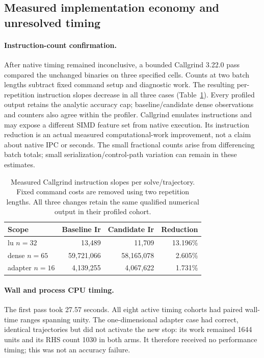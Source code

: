 \subsection{Measured implementation economy and unresolved timing}
\paragraph{Instruction-count confirmation.}
After native timing remained inconclusive, a bounded Callgrind 3.22.0 pass
compared the unchanged binaries on three specified cells. Counts at two batch
lengths subtract fixed command setup and diagnostic work. The resulting
per-repetition instruction slopes decrease in all three cases
(Table~\ref{tab:instructions}). Every profiled output retains the analytic
accuracy cap; baseline/candidate dense observations and counters also agree
within the profiler. Callgrind emulates instructions and may expose a different
SIMD feature set from native execution. Its instruction reduction is an actual
measured computational-work improvement, not a claim about native IPC or seconds.
The small fractional counts arise from differencing batch totals; small
serialization/control-path variation can remain in these estimates.

\begin{table}[t]
\caption{Measured Callgrind instruction slopes per solve/trajectory. Fixed
command costs are removed using two repetition lengths. All three changes
retain the same qualified numerical output in their profiled cohort.}
\label{tab:instructions}
\begin{ruledtabular}
\begin{tabular}{lrrr}
Scope & Baseline Ir & Candidate Ir & Reduction\\
\hline
lu $n=32$ & 13,489 & 11,709 & 13.196\% \\
dense $n=65$ & 59,721,066 & 58,165,078 & 2.605\% \\
adapter $n=16$ & 4,139,255 & 4,067,622 & 1.731\% \\
\end{tabular}
\end{ruledtabular}
\end{table}

\paragraph{Wall and process CPU timing.}
The first pass took 27.57 seconds. All eight active timing cohorts had paired
wall-time ranges spanning unity. The one-dimensional adapter case had correct,
identical trajectories but did not activate the new stop: its work remained
1644 units and its RHS count 1030 in both arms. It therefore received no
performance timing; this was not an accuracy failure.


